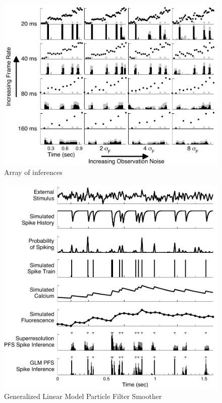 \documentclass[10pt]{article}
\begin{document}
\clearpage \newpage
\begin{figure}
\includegraphics[width=1.0\linewidth]{ArraySim_bw}
\caption{Array of inferences} \label{fig:array}
\end{figure}

\clearpage \newpage
\begin{figure}
\begin{centering}
\includegraphics[width=1\linewidth]{StimSim_bw}
\end{centering}
\caption{Generalized Linear Model Particle Filter Smoother} \label{fig:StimSim}
\end{figure}
\end{document}
